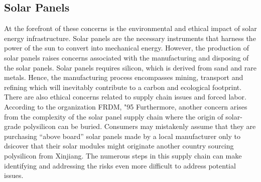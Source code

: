 \documentclass[10pt,twocolumn]{article}
\begin{document}
\subsection{Solar Panels}
At the forefront of these concerns is the environmental and ethical impact of solar energy infrastructure. Solar panels are the necessary instruments that harness the power of the sun to convert into mechanical energy. However, the production of solar panels raises concerns associated with the manufacturing and disposing of the solar panels. Solar panels requires silicon, which is derived from sand  and rare metals. Hence, the manufacturing process encompasses mining, transport and refining which will inevitably contribute to a carbon and ecological footprint.  There are also ethical concerns related to supply chain issues and forced labor. According to the organization FRDM, "95%
Furthermore, another concern arises from the complexity of the solar panel supply chain where the origin of solar-grade polysilicon can be buried. Consumers may mistakenly assume that they are purchasing “above board” solar panels made by a local manufacturer only to dsicover that their solar modules might originate another country sourcing polysilicon from Xinjiang. The numerous steps in this supply chain can make identifying and addressing the risks even more difficult to address potential issues. 
\end{document}
